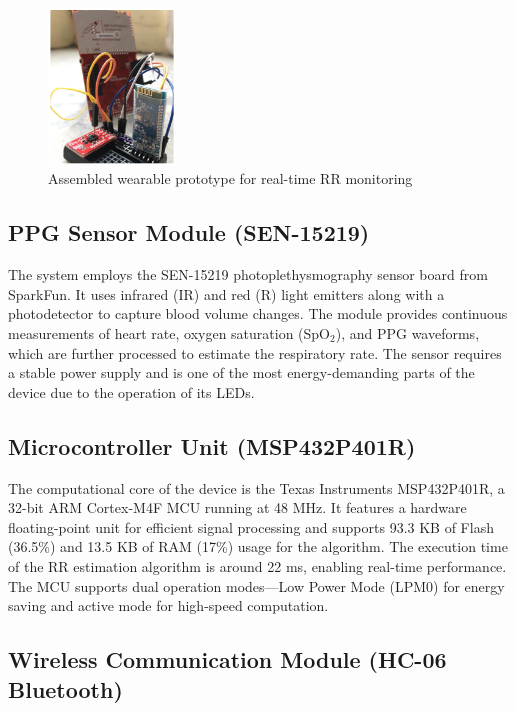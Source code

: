 \documentclass[12pt,a4paper]{report}
\begin{document}
\begin{figure}[]
    \centering
    \includegraphics[width=0.3\textwidth]{hardware architech.png}
    \caption{Assembled wearable prototype for real-time RR monitoring}
    \label{5.10cm}
\end{figure}


\subsection{PPG Sensor Module (SEN-15219)}

The system employs the SEN-15219 photoplethysmography sensor board from SparkFun. It uses infrared (IR) and red (R) light emitters along with a photodetector to capture blood volume changes. The module provides continuous measurements of heart rate, oxygen saturation (SpO$_2$), and PPG waveforms, which are further processed to estimate the respiratory rate. The sensor requires a stable power supply and is one of the most energy-demanding parts of the device due to the operation of its LEDs.



\subsection{Microcontroller Unit (MSP432P401R)}

The computational core of the device is the Texas Instruments MSP432P401R, a 32-bit ARM Cortex-M4F MCU running at 48 MHz. It features a hardware floating-point unit for efficient signal processing and supports 93.3 KB of Flash (36.5\%) and 13.5 KB of RAM (17\%) usage for the algorithm. The execution time of the RR estimation algorithm is around 22 ms, enabling real-time performance. The MCU supports dual operation modes—Low Power Mode (LPM0) for energy saving and active mode for high-speed computation.

\subsection{Wireless Communication Module (HC-06 Bluetooth)}
\end{document}
